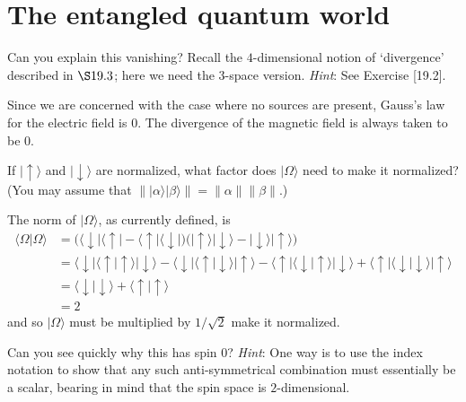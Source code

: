 \documentclass[../road-to-reality.tex]{subfiles}
\begin{document}
	\printanswers
	
	\section{The entangled quantum world}
	
	\begin{questions}
		\question Can you explain this vanishing? Recall the $4$-dimensional notion of `divergence' described in $\S19.3$; here we need the $3$-space version. \textit{Hint}: See Exercise [19.2].
		
		\begin{solution}
			Since we are concerned with the case where no sources are present, Gauss's law for the electric field is $0$. The divergence of the magnetic field is always taken to be $0$.
		\end{solution}
	
		\question If $|\!\uparrow\rangle$ and $|\!\downarrow\rangle$ are normalized, what factor does $|\Omega\rangle$ need to make it normalized? (You may assume that $\||\alpha\rangle|\beta\rangle\|=\|\alpha\|\|\beta\|$.)
		
		\begin{solution}
			The norm of $|\Omega\rangle$, as currently defined, is
			\begin{align*}
				\langle\Omega|\Omega\rangle &= \big(\langle\downarrow\!|\langle\uparrow\!| - \langle\uparrow\!|\langle\downarrow\!|\big)\big(|\!\uparrow\rangle|\!\downarrow\rangle - |\!\downarrow\rangle|\!\uparrow\rangle\big) \\
				&= \langle\downarrow\!|\langle\uparrow\!|\!\uparrow\rangle|\!\downarrow\rangle - \langle\downarrow\!|\langle\uparrow\!|\!\downarrow\rangle|\!\uparrow\rangle - \langle\uparrow\!|\langle\downarrow\!|\!\uparrow\rangle|\!\downarrow\rangle + \langle\uparrow\!|\langle\downarrow\!|\!\downarrow\rangle|\!\uparrow\rangle \\
				&= \langle\downarrow\!|\!\downarrow\rangle + \langle\uparrow\!|\!\uparrow\rangle \\
				&= 2
			\end{align*}
			and so $|\Omega\rangle$ must be multiplied by $1/\sqrt{2}$ make it normalized.
		\end{solution}
	
		\question Can you see quickly why this has spin $0$? \textit{Hint}: One way is to use the index notation to show that any such anti-symmetrical combination must essentially be a scalar, bearing in mind that the spin space is $2$-dimensional.
		

\end{questions}
\end{document}
